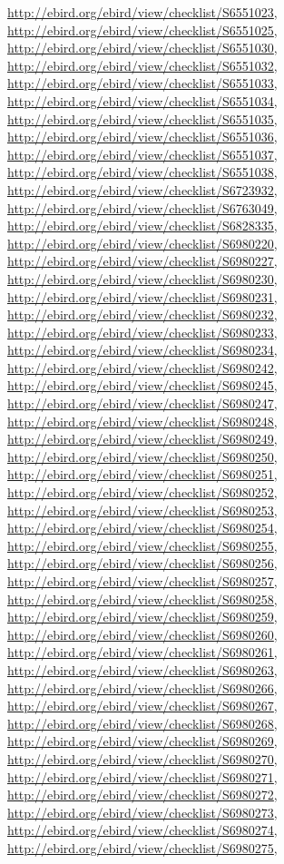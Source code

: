 \documentclass[9pt, article]{memoir}
\begin{document}
\begin{multicols}{2}
\url{http://ebird.org/ebird/view/checklist/S6551023}, 
\url{http://ebird.org/ebird/view/checklist/S6551025}, 
\url{http://ebird.org/ebird/view/checklist/S6551030}, 
\url{http://ebird.org/ebird/view/checklist/S6551032}, 
\url{http://ebird.org/ebird/view/checklist/S6551033}, 
\url{http://ebird.org/ebird/view/checklist/S6551034}, 
\url{http://ebird.org/ebird/view/checklist/S6551035}, 
\url{http://ebird.org/ebird/view/checklist/S6551036}, 
\url{http://ebird.org/ebird/view/checklist/S6551037}, 
\url{http://ebird.org/ebird/view/checklist/S6551038}, 
\url{http://ebird.org/ebird/view/checklist/S6723932}, 
\url{http://ebird.org/ebird/view/checklist/S6763049}, 
\url{http://ebird.org/ebird/view/checklist/S6828335}, 
\url{http://ebird.org/ebird/view/checklist/S6980220}, 
\url{http://ebird.org/ebird/view/checklist/S6980227}, 
\url{http://ebird.org/ebird/view/checklist/S6980230}, 
\url{http://ebird.org/ebird/view/checklist/S6980231}, 
\url{http://ebird.org/ebird/view/checklist/S6980232}, 
\url{http://ebird.org/ebird/view/checklist/S6980233}, 
\url{http://ebird.org/ebird/view/checklist/S6980234}, 
\url{http://ebird.org/ebird/view/checklist/S6980242}, 
\url{http://ebird.org/ebird/view/checklist/S6980245}, 
\url{http://ebird.org/ebird/view/checklist/S6980247}, 
\url{http://ebird.org/ebird/view/checklist/S6980248}, 
\url{http://ebird.org/ebird/view/checklist/S6980249}, 
\url{http://ebird.org/ebird/view/checklist/S6980250}, 
\url{http://ebird.org/ebird/view/checklist/S6980251}, 
\url{http://ebird.org/ebird/view/checklist/S6980252}, 
\url{http://ebird.org/ebird/view/checklist/S6980253}, 
\url{http://ebird.org/ebird/view/checklist/S6980254}, 
\url{http://ebird.org/ebird/view/checklist/S6980255}, 
\url{http://ebird.org/ebird/view/checklist/S6980256}, 
\url{http://ebird.org/ebird/view/checklist/S6980257}, 
\url{http://ebird.org/ebird/view/checklist/S6980258}, 
\url{http://ebird.org/ebird/view/checklist/S6980259}, 
\url{http://ebird.org/ebird/view/checklist/S6980260}, 
\url{http://ebird.org/ebird/view/checklist/S6980261}, 
\url{http://ebird.org/ebird/view/checklist/S6980263}, 
\url{http://ebird.org/ebird/view/checklist/S6980266}, 
\url{http://ebird.org/ebird/view/checklist/S6980267}, 
\url{http://ebird.org/ebird/view/checklist/S6980268}, 
\url{http://ebird.org/ebird/view/checklist/S6980269}, 
\url{http://ebird.org/ebird/view/checklist/S6980270}, 
\url{http://ebird.org/ebird/view/checklist/S6980271}, 
\url{http://ebird.org/ebird/view/checklist/S6980272}, 
\url{http://ebird.org/ebird/view/checklist/S6980273}, 
\url{http://ebird.org/ebird/view/checklist/S6980274}, 
\url{http://ebird.org/ebird/view/checklist/S6980275}, 

\end{multicols}
\end{document}
